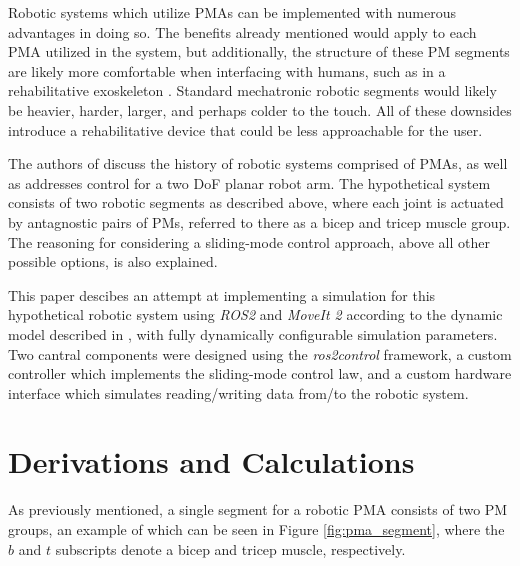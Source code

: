 \documentclass[conference]{IEEEtran}
\begin{document}
	Robotic systems which utilize \acp{PMA} can be implemented with numerous advantages in doing so. The benefits already mentioned would apply to each \ac{PMA} utilized in the system, but additionally, the structure of these \ac{PM} segments are likely more comfortable when interfacing with humans, such as in a rehabilitative exoskeleton \cite{main-article}. Standard mechatronic robotic segments would likely be heavier, harder, larger, and perhaps colder to the touch. All of these downsides introduce a rehabilitative device that could be less approachable for the user.

	The authors of \cite{main-article} discuss the history of robotic systems comprised of \acp{PMA}, as well as addresses control for a two \ac{DoF} planar robot arm. The hypothetical system consists of two robotic segments as described above, where each joint is actuated by antagnostic pairs of \acp{PM}, referred to there as a bicep and tricep muscle group. The reasoning for considering a sliding-mode control approach, above all other possible options, is also explained.

	This paper descibes an attempt at implementing a simulation for this hypothetical robotic system using \textit{ROS2} and \textit{MoveIt 2} according to the dynamic model described in \cite{main-article}, with fully dynamically configurable simulation parameters. Two cantral components were designed using the \textit{ros2\textunderscore control} framework, a custom controller which implements the sliding-mode control law, and a custom hardware interface which simulates reading/writing data from/to the robotic system.

	\section{Derivations and Calculations}

	As previously mentioned, a single segment for a robotic \ac{PMA} consists of two \ac{PM} groups, an example of which can be seen in Figure \ref{fig:pma_segment}, where the $b$ and $t$ subscripts denote a bicep and tricep muscle, respectively.
\end{document}
